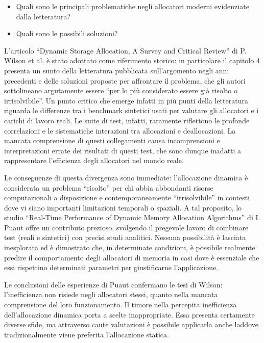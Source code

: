 \begin{itemize}
  \item Quali sono le principali problematiche negli allocatori moderni evidenziate dalla letteratura?
  \item Quali sono le possibili soluzioni?
\end{itemize}

L’articolo ``Dynamic Storage Allocation, A Survey and Critical Review'' di P. Wilson et al. è stato adottato come riferimento storico: in particolare il capitolo 4 presenta un sunto della letteratura pubblicata sull’argomento negli anni precedenti e delle soluzioni proposte per affrontare il problema, che gli autori sottolineano argutamente essere ``per lo più considerato essere già risolto o irrisolvibile''. Un punto critico che emerge infatti in più punti della letteratura riguarda le differenze tra i benchmark sintetici usati per valutare gli allocatori e i carichi di lavoro reali. Le suite di test, infatti, raramente riflettono le profonde correlazioni e le sistematiche interazioni tra allocazioni e deallocazioni. La mancata comprensione di questi collegamenti causa incomprensioni e interpretazioni errate dei risultati di questi test, che sono dunque inadatti a rappresentare l’efficienza degli allocatori nel mondo reale.

Le conseguenze di questa divergenza sono immediate: l’allocazione dinamica è considerata un problema ``risolto'' per chi abbia abbondanti risorse computazionali a disposizione e contemporaneamente ``irrisolvibile'' in contesti dove vi siano importanti limitazioni temporali o spaziali. A tal proposito, lo studio ``Real-Time Performance of Dynamic Memory Allocation Algorithms'' di I. Puaut offre un contributo prezioso, svolgendo il pregevole lavoro di combinare test (reali e sintetici) con precisi studi analitici. Nessuna possibilità è lasciata inesplorata ed è dimostrato che, in determinate condizioni, è possibile realmente predire il comportamento degli allocatori di memoria in casi dove è essenziale che essi rispettino determinati parametri per giustificarne l’applicazione.

Le conclusioni delle esperienze di Puaut confermano le tesi di Wilson: l’inefficienza non risiede negli allocatori stessi, quanto nella mancata comprensione del loro funzionamento. Il timore nella percepita inefficienza dell’allocazione dinamica porta a scelte inappropriate. Essa presenta certamente diverse sfide, ma attraverso caute valutazioni è possibile applicarla anche laddove tradizionalmente viene preferita l’allocazione statica.

